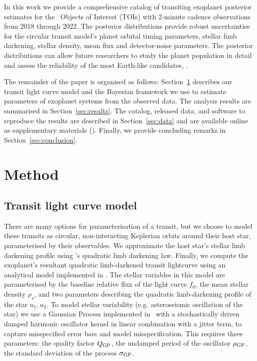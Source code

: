 \documentclass[linenumbers,floatfix,ApJL,twocolumn]{aastex631}
\begin{document}
In this work we provide a comprehensive catalog of transiting exoplanet posterior estimates for the \red{\numAnalysed} \tess\ Objects of Interest (TOIs) with 2-minute cadence observations from 2018 through 2022. 
The posterior distributions provide robust uncertainties for the circular transit model's planet orbital timing parameters, stellar limb darkening, stellar density, mean flux and detector-noise parameters. 
The posterior distributions can allow future researchers to study the planet population in detail and assess the reliability of the most Earth-like candidates, .

The remainder of the paper is organised as follows: Section~\ref{sec:method} describes our transit light curve model and the Bayesian framework we use to estimate parameters of exoplanet systems from the observed data. 
The analysis results are summarised in Section~\ref{sec:results}.
The catalog, released data, and software to reproduce the results are described in Section~\ref{sec:data} and are available online as supplementary materials (\atlasUrl).
Finally, we provide concluding remarks in Section~\ref{sec:conclusion}.

\section{Method} \label{sec:method}


\subsection{Transit light curve model}

There are many options for parameterisation of a transit, but we choose to model these transits as circular, non-interacting Keplerian orbits around their host star, parameterised by their observables. 
We approximate the host star's stellar limb darkening profile using \citet{Kipping:2013:MNRAS}'s quadratic limb darkening law.
Finally, we compute the exoplanet's resultant quadratic limb-darkened transit lightcurve using an analytical model implemented in \starry.
The stellar variables in this model are parameterised by
the baseline relative flux of the light curve $f_0$,
the mean stellar density $\rho_\star$,
and two parameters describing the quadratic limb-darkening profile of the
star $u_1, u_2$.
To model stellar variability (e.g. asteroseismic oscillation of the star)  we use a Gaussian Process implemented in \celerite\ with a stochastically driven damped harmonic oscillator kernel in linear combination with a jitter term, to capture misspecified error bars and model misspecification. This requires three parameters: the quality factor $Q_{\rm GP}$, the undamped period of the oscillator $\rho_{\rm GP}$, the standard deviation of the process $\sigma_{\rm GP}$.
\end{document}
